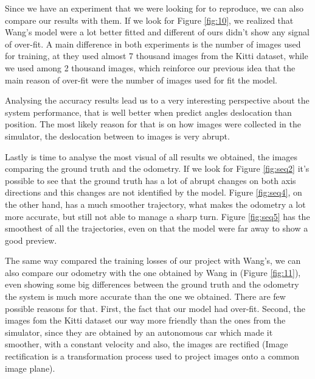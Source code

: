         Since we have an experiment that we were looking for to reproduce, we can also compare our results with them. If we look for Figure \ref{fig:10}, we realized that Wang's model were a lot better fitted and different of ours didn’t show any signal of over-fit. A main difference in both experiments is the number of images used for training, at \cite{wang2017deepvo} they used almost 7 thousand images from the Kitti dataset, while we used among 2 thousand images, which reinforce our previous idea that the main reason of over-fit were the number of images used for fit the model.
        
        Analysing the accuracy results lead us to a very interesting perspective about the system performance, that is well better when predict angles deslocation than position. The most likely reason for that is on how images were collected in the simulator, the deslocation between to images is very abrupt.
        
        Lastly is time to analyse the most visual of all results we obtained, the images comparing the ground truth and the odometry. If we look for Figure \ref{fig:seq2} it's possible to see that the ground truth has a lot of abrupt changes on both axis directions and this changes are not identified by the model. Figure \ref{fig:seq4}, on the other hand, has a much smoother trajectory, what makes the odometry a lot more accurate, but still not able to manage a sharp turn. Figure \ref{fig:seq5} has the smoothest of all the trajectories, even on that the model were far away to show a good preview.
        
        The same way compared the training losses of our project with Wang's, we can also compare our odometry with the one obtained by Wang in \cite{wang2017deepvo} (Figure \ref{fig:11}), even showing some big differences between the ground truth and the odometry the system is much more accurate than the one we obtained. There are few possible reasons for that. First, the fact that our model had over-fit. Second, the images fom the Kitti dataset our way more friendly than the ones from the simulator, since they are obtained by an autonomous car which made it smoother, with a constant velocity and also, the images are rectified (Image rectification is a transformation process used to project images onto a common image plane).